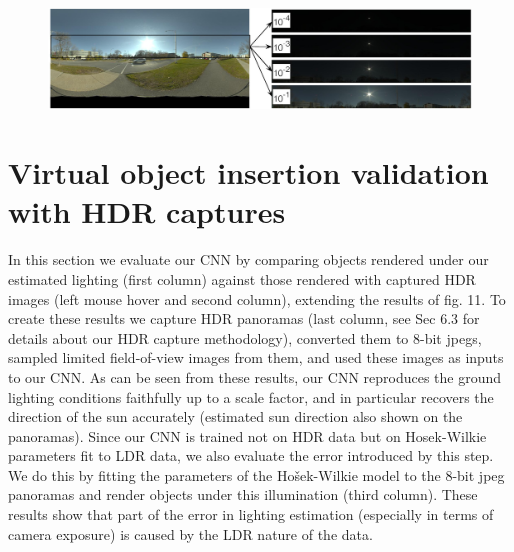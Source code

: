 \begin{figure}
\centering
\includegraphics[width=\mywidth]{db-sunny.jpg}
\caption{}
\end{figure}

\protect\hypertarget{virtualobjectinsertHDR}{}{}

\hypertarget{virtual-object-insertion-validation-with-hdr-captures}{%
\section{Virtual object insertion validation with HDR
captures}\label{virtual-object-insertion-validation-with-hdr-captures}}

In this section we evaluate our CNN by comparing objects rendered under
our estimated lighting (first column) against those rendered with
captured HDR images (left mouse hover and second column), extending the
results of fig. 11. To create these results we capture HDR panoramas
(last column, see Sec 6.3 for details about our HDR capture
methodology), converted them to 8-bit jpegs, sampled limited
field-of-view images from them, and used these images as inputs to our
CNN. As can be seen from these results, our CNN reproduces the ground
lighting conditions faithfully up to a scale factor, and in particular
recovers the direction of the sun accurately (estimated sun direction
also shown on the panoramas). Since our CNN is trained not on HDR data
but on Hosek-Wilkie parameters fit to LDR data, we also evaluate the
error introduced by this step. We do this by fitting the parameters of
the Hošek-Wilkie model to the 8-bit jpeg panoramas and render objects
under this illumination (third column). These results show that part of
the error in lighting estimation (especially in terms of camera
exposure) is caused by the LDR nature of the data.


\def\panoheight{0.25cm}

